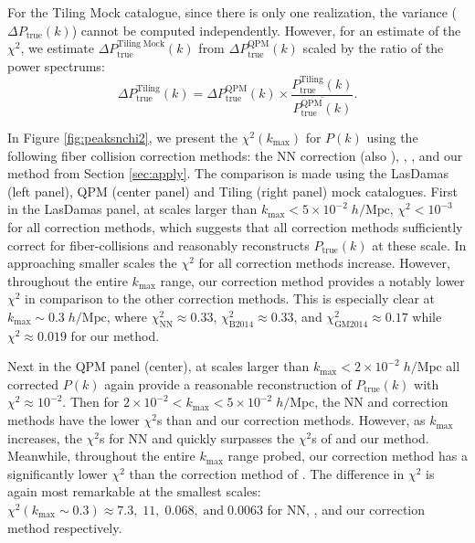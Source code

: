 \documentclass{emulateapj}
\begin{document}
For the Tiling Mock catalogue, since there is only one realization, the variance ($\Delta P_\mathrm{true} (k)$) cannot be computed independently. However, for an estimate of the $\chi^2$, we estimate $\Delta P_\mathrm{true}^\mathrm{Tiling\;Mock}(k)$ from $\Delta P^\mathrm{QPM}_\mathrm{true} (k)$ scaled by the ratio of the power spectrums:
\begin{equation}
\Delta P_\mathrm{true}^\mathrm{Tiling}(k) = \Delta P_\mathrm{true}^\mathrm{QPM}(k) \times \frac{P_\mathrm{true}^\mathrm{Tiling}(k)}{\overline{P^\mathrm{QPM}_\mathrm{true}(k)}}.
\end{equation}

In Figure \ref{fig:peaksnchi2}, we present the $\chi^2(k_\mathrm{max})$ for $P(k)$ using the following fiber collision correction methods: the NN correction (also \citealt{Anderson:2012aa}), \cite{Beutler:2014aa}, \cite{Gil-Marin:2014aa}, and our method from Section \ref{sec:apply}. The comparison is made using the LasDamas (left panel), QPM (center panel) and Tiling (right panel) mock catalogues. First in the LasDamas panel, at scales larger than $k_\mathrm{max} < 5 \times 10^{-2} \; h/\mathrm{Mpc}$, $\chi^2 < 10^{-3}$ for all correction methods, which suggests that all correction methods sufficiently correct for fiber-collisions and reasonably reconstructs $P_\mathrm{true}(k)$ at these scale. In approaching smaller scales the $\chi^2$ for all correction methods increase. However, throughout the entire $k_\mathrm{max}$ range, our correction method provides a notably lower $\chi^2$ in comparison to the other correction methods. This is especially clear at $k_\mathrm{max} \sim 0.3 \; h/\mathrm{Mpc}$, where $\chi^2_\mathrm{NN} \approx 0.33$, $\chi^2_\mathrm{B2014} \approx 0.33$, and $\chi^2_\mathrm{GM2014} \approx 0.17$ while $\chi^2 \approx 0.019$ for our method. 

Next in the QPM panel (center), at scales larger than $k_\mathrm{max} < 2 \times 10^{-2} \; h/\mathrm{Mpc}$ all corrected $P(k)$ again provide a reasonable reconstruction of $P_\mathrm{true}(k)$ with $\chi^2 \approx 10^{-2}$. Then for $2 \times 10^{-2} < k_\mathrm{max} < 5 \times 10^{-2}\; h/\mathrm{Mpc}$, the NN and \cite{Beutler:2014aa} correction methods have the lower $\chi^2$s than \cite{Gil-Marin:2014aa} and our correction methods. However, as $k_\mathrm{max}$ increases, the $\chi^2$s for NN and \cite{Beutler:2014aa} quickly surpasses the $\chi^2$s of \cite{Gil-Marin:2014aa} and our method. Meanwhile, throughout the entire $k_\mathrm{max}$ range probed, our correction method has a significantly lower $\chi^2$ than the correction method of \cite{Gil-Marin:2014aa}. The difference in $\chi^2$ is again most remarkable at the smallest scales: $\chi^2 (k_\mathrm{max} \sim 0.3) \approx 7.3,\;11, \;0.068, \;\mathrm{and} \; 0.0063$ for NN, \cite{Beutler:2014aa}, \cite{Gil-Marin:2014aa} and our correction method respectively. 
\end{document}
